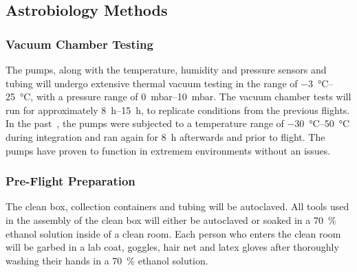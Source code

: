 \subsection{Astrobiology Methods}
\label{sec:Astrobiology Methods}

\subsubsection{Vacuum Chamber Testing}
\label{subsec:Astro Vacuum}


The pumps, along with the temperature, humidity and pressure sensors and tubing will undergo extensive thermal vacuum testing in the range of \SIrange{-3}{25}{\celsius}, with a pressure range of \SIrange{0}{10}{\milli\bar}. The vacuum chamber tests will run for approximately \SIrange{8}{15}{\hour}, to replicate conditions from the previous flights. In the past~\cite{SORA}, the pumps were subjected to a temperature range of \SIrange{-30}{50}{\celsius} during integration and ran again for \SI{8}{\hour} afterwards and prior to flight. The pumps have proven to function in extremem environments without an issues. 


\subsubsection{Pre-Flight Preparation}


The clean box, collection containers and tubing will be autoclaved. All tools used in the assembly of the clean box will either be autoclaved or soaked in a \SI{70}{\percent} ethanol solution inside of a clean room. Each person who enters the clean room will be garbed in a lab coat, goggles, hair net and latex gloves after thoroughly washing their hands in a \SI{70}{\percent} ethanol solution. 


